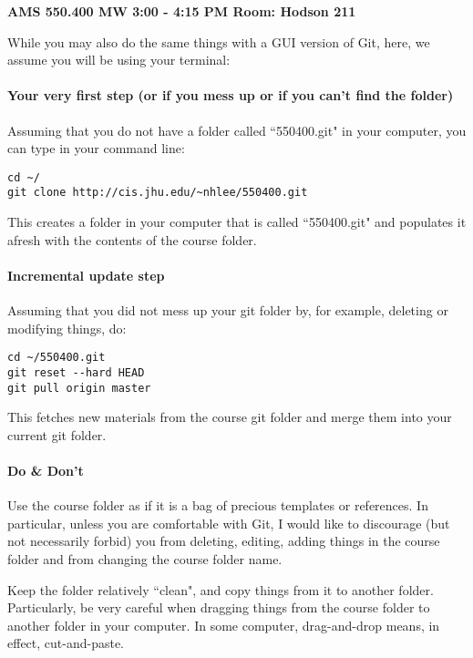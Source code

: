 \documentclass[12pt]{article}
\begin{document}
\begin{center}
{\bf AMS 550.400 \quad MW 3:00 - 4:15 PM \quad  Room: Hodson 211}
\end{center}

While you may also do the same things with a GUI version of Git, 
here, we assume you will be using your terminal: 

\paragraph{Your very first step (or if you mess up or if you can't find
the folder)}

Assuming that you do not have a folder called ``550400.git" in your computer,
you can type in your command line:

\begin{lstlisting}
cd ~/
git clone http://cis.jhu.edu/~nhlee/550400.git
\end{lstlisting}
This creates a folder in your computer that is called 
``550400.git" and populates it afresh with the contents of 
the course folder.

\paragraph{Incremental update step}

Assuming that you did not mess up your git folder by,
for example, deleting or modifying things, do:

\begin{lstlisting}
cd ~/550400.git
git reset --hard HEAD
git pull origin master
\end{lstlisting}
This fetches new materials from the course git folder and 
merge them into your current git folder. 

\paragraph{Do \& Don't}

Use the course folder as if it is a bag of precious templates or references. 
In particular, unless you are comfortable with Git,
I would like to discourage (but not necessarily forbid) you 
from deleting, editing, adding things in the course folder and from 
changing the course folder name. 

Keep the folder relatively ``clean", and copy things from it to another folder.
Particularly, be very careful when dragging things from the course folder to 
another folder in your computer. 
In some computer, drag-and-drop means, in effect, cut-and-paste. 
\end{document}
